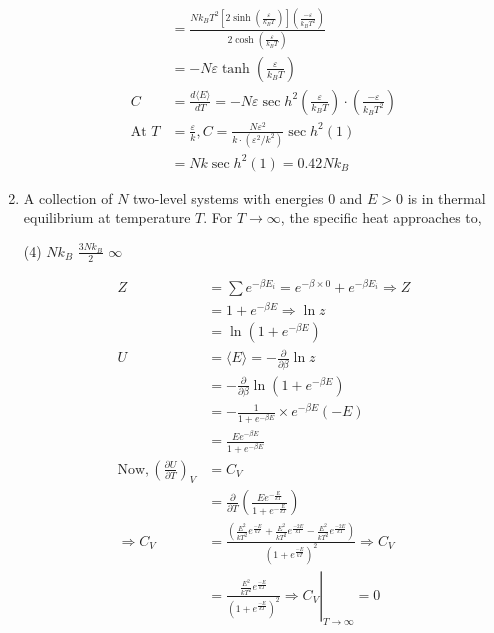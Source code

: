 \begin{enumerate}
\begin{answer}
\begin{align*}
		&=\frac{N k_{B} T^{2}\left[2 \sinh \left(\frac{\varepsilon}{k_{B} T}\right)\right]\left(\frac{-\varepsilon}{k_{B} T^{2}}\right)}{2 \cosh \left(\frac{\varepsilon}{k_{B} T}\right)}\\&=-N \varepsilon \tanh \left(\frac{\varepsilon}{k_{B} T}\right)\\
		C&=\frac{d\langle E\rangle}{d T}=-N \varepsilon \sec h^{2}\left(\frac{\varepsilon}{k_{B} T}\right) \cdot\left(\frac{-\varepsilon}{k_{B} T^{2}}\right)\\
		\text{At }T&=\frac{\varepsilon}{k}, C=\frac{N \varepsilon^{2}}{k \cdot\left(\varepsilon^{2} / k^{2}\right)} \sec h^{2}(1)\\&=N k \sec h^{2}(1)=0.42 N k_{B}
		\end{align*}
	\end{answer}	
	\item A collection of $N$ two-level systems with energies 0 and $E>0$ is in thermal
	equilibrium at temperature $T$. For $T \rightarrow \infty$, the specific heat approaches to,
	{}
	\begin{tasks}(4)
		\task[\textbf{B.}] $N k_{B}$
		\task[\textbf{C.}] $\frac{3 N k_{B}}{2}$
		\task[\textbf{D.}] $\infty$
	\end{tasks}
	\begin{answer}
		\begin{align*}
		Z&=\sum e^{-\beta E_{i}}=e^{-\beta \times 0}+e^{-\beta E_{i}} \Rightarrow Z\\&=1+e^{-\beta E} \Rightarrow \ln z\\&=\ln \left(1+e^{-\beta E}\right)\\
		U&=\langle E\rangle=-\frac{\partial}{\partial \beta} \ln z\\&=-\frac{\partial}{\partial \beta} \ln \left(1+e^{-\beta E}\right)\\&=-\frac{1}{1+e^{-\beta E}} \times e^{-\beta E}(-E)\\&=\frac{E e^{-\beta E}}{1+e^{-\beta E}}\\
		\text{Now},\left(\frac{\partial U}{\partial T}\right)_{V}&=C_{V}\\
		&=\frac{\partial}{\partial T}\left(\frac{E e^{-\frac{E}{k T}}}{1+e^{-\frac{E}{k T}}}\right)\\
		\Rightarrow C_{V}&=\frac{\left(\frac{E^{2}}{k T^{2}} e^{\frac{-E}{k T}}+\frac{E^{2}}{k T^{2}} e^{\frac{-2 E}{k T}}-\frac{E^{2}}{k T^{2}} e^{\frac{-2 E}{k T}}\right)}{\left(1+e^{\frac{-E}{k T}}\right)^{2}} \Rightarrow C_{V}\\
		&=\left.\frac{\frac{E^{2}}{k T^{2}} e^{\frac{-E}{k T}}}{\left(1+e^{\frac{-E}{k T}}\right)^{2}} \Rightarrow C_{V}\right|_{T \rightarrow \infty}=0

\end{align*}
\end{answer}
\end{enumerate}

